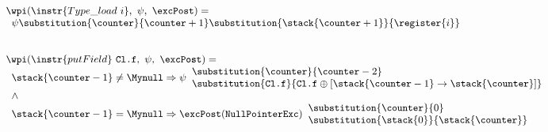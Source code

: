 \begin{figure}[t]
\[
\small{
\begin{array}{l}
\wpi(\instr{Type\_load \ i}, \ \psi, \ \excPost)  = \\
\begin{array}{l}  \psi\substitution{\counter }{\counter+1} \substitution{\stack{\counter+1}}{\register{i}} \end{array} \\
\\
\\






 \wpi(\instr{putField} \ \texttt{Cl.f}, \ \psi, \ \excPost)  = \\
\begin{array}{l}

   		\stack{\counter -1} \not= \Mynull\Rightarrow   
	 \psi\begin{array}{l} \substitution{\counter}{ \counter-2 } \\[0 mm] 
   	                   \substitution{\texttt{Cl.f} }{ \texttt{Cl.f}\oplus [\stack{\counter -1} \rightarrow \stack{\counter}] } \\
		\end{array}\\

   \wedge \\
   	\stack{\counter-1} = \Mynull 	\Rightarrow \excPost(\tt{NullPointerExc})
        \begin{array}{l}
          \substitution{ \counter }{ 0} \\
          \substitution{\stack{0}}{ \stack{\counter}} 
	\end{array}
    \end{array} %
\end{array}}
 \]	  \\



\end{figure}
